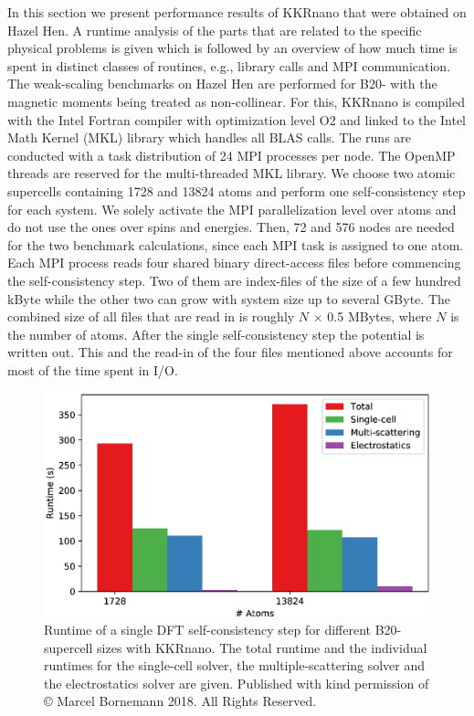 \documentclass[graybox]{svmult}
\begin{document}
In this section we present performance results of KKRnano that were obtained on Hazel Hen.
A runtime analysis of the parts that are related to the specific physical problems is given
which is followed by an overview of how much time is spent in distinct
classes of routines, e.g., library calls and MPI communication.
The weak-scaling benchmarks on Hazel Hen are performed for B20- 
with the magnetic moments being treated as
non-collinear.
For this, KKRnano is compiled with the Intel Fortran compiler
with optimization level O2 and linked to the Intel Math Kernel (MKL) library which handles all BLAS calls.
The runs are conducted with a task distribution of 24 MPI processes per node. The OpenMP threads 
are reserved for the multi-threaded MKL library.
We choose two atomic supercells containing 1728 and 13824 atoms 
and perform one self-consistency step for each system.
We solely activate the MPI parallelization level over atoms and do not use the ones over spins and energies.
Then, 72 and 576  nodes
are needed for the two benchmark calculations, since each MPI task is assigned to one atom. 
Each MPI process reads four shared binary direct-access
files before commencing the self-consistency step.
Two of them are index-files of the size of a few hundred kByte while the other two can grow with system size
up to several GByte. The combined size of all files that are 
read in is roughly $N$ $\times$ 0.5 MBytes, where $N$ is the number of atoms. 
After the single self-consistency step 
the potential is written out. 
This and the read-in of the four files mentioned above accounts for most of the time spent in I/O.
\begin{figure}[htb]
\begin{center}
 \includegraphics[width=1.0\textwidth]{Figures/MnGe_benchmarks.eps}
\end{center}
	\caption{Runtime of a single DFT self-consistency step
	for different B20- supercell sizes with KKRnano. 
	The total runtime and the individual runtimes for the single-cell solver,
	the multiple-scattering solver and the electrostatics solver are given.
	Published with kind permission of © Marcel Bornemann 2018. All Rights Reserved.
	}
\label{fig:MnGe_6x6x6_benchmark}
\end{figure}
\end{document}
